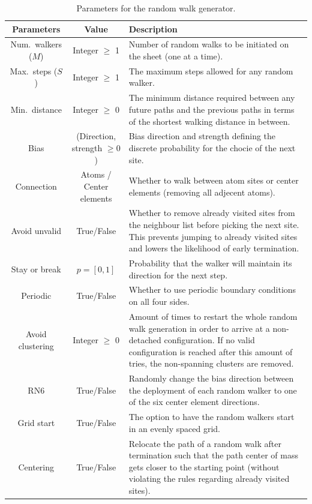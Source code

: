 \begin{table}[H]
  \begin{center}
  \caption{Parameters for the random walk generator.}
  \label{tab:RW_params}
  \begin{tabular}{ | c | c | m{8cm} |} \hline
  \textbf{Parameters} & \textbf{Value} & \textbf{Description}  \\ \hline
  Num.\ walkers ($M$) & Integer $\ge$ 1 & Number of random walks to be initiated on the sheet (one at a time). \\ \hline
  Max.\ steps ($S$)  & Integer $\ge$ 1 &The maximum steps allowed for any random walker. \\ \hline
  Min.\ distance  & Integer $\ge$ 0 &The minimum distance required between any future paths and the previous paths in terms of the shortest walking distance in between. \\ \hline
  Bias  & (Direction, strength $\ge0$) & Bias direction and strength defining the discrete probability for the chocie of the next site. \\ \hline
  Connection  & Atoms / Center elements & Whether to walk between atom sites or center elements (removing all adjecent atoms). \\ \hline
  Avoid unvalid  & True/False & Whether to remove already visited sites from the neighbour list before picking the next site. This prevents jumping to already visited sites and lowers the likelihood of early termination.  \\ \hline
  Stay or break  & $p = [0,1]$ & Probability that the walker will maintain its direction for the next step. \\ \hline
  Periodic  & True/False & Whether to use periodic boundary conditions on all four sides. \\ \hline
  Avoid clustering  & Integer $\ge$ 0 & Amount of times to restart the whole random walk generation in order to arrive at a non-detached configuration. If no valid configuration is reached after this amount of tries, the non-spanning clusters are removed.\\ \hline
  RN6  & True/False & Randomly change the bias direction between the deployment of each random walker to one of the six center element directions. \\ \hline
  Grid start  & True/False & The option to have the random walkers start in an evenly spaced grid. \\ \hline
  Centering  & True/False & Relocate the path of a random walk after termination such that the path center of mass gets closer to the starting point (without violating the rules regarding already visited sites).\\ \hline
  \end{tabular}
  \end{center}
\end{table}


